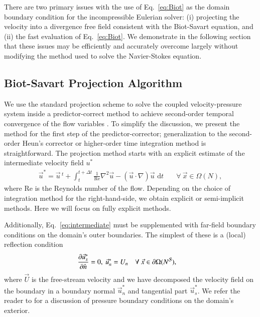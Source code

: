 \documentclass[final,1p,times]{elsarticle}
\begin{document}
There are two primary issues with the use of Eq.~\ref{eq:Biot} as the domain boundary condition for the incompressible Eulerian solver: (i) projecting the velocity into a divergence free field consistent with the Biot-Savart equation, and (ii) the fast evaluation of Eq.~\ref{eq:Biot}. We demonstrate in the following section that these issues may be efficiently and accurately overcome largely without modifying the method used to solve the Navier-Stokes equation.

\subsection{Biot-Savart Projection Algorithm}\label{sec:Biot_projection}

We use the standard projection scheme \cite{Chorin1967} to solve the coupled velocity-pressure system inside a predictor-correct method to achieve second-order temporal convergence of the flow variables \cite{Lauber2022}. 
To simplify the discussion, we present the method for the first step of the predictor-corrector; generalization to the second-order Heun's corrector or higher-order time integration method is straightforward. The projection method starts with an explicit estimate of the intermediate velocity field $u^*$
\begin{align}\label{eq:intermediate}
    \vec{u}^* = \vec{u}\,^t + \int_{t}^{t+\Delta t}\frac{1}{\text{Re}}\nabla^2\vec{u} -\left(\vec{u}\cdot\nabla\right)\vec{u}\text{ d}t &\quad\forall\ \vec{x}\in\Omega (N),
\end{align}
where $\text{Re}$ is the Reynolds number of the flow. Depending on the choice of integration method for the right-hand-side, we obtain explicit or semi-implicit methods. Here we will focus on fully explicit methods. 


Additionally, Eq.~\eqref{eq:intermediate} must be supplemented with far-field boundary conditions on the domain's outer boundaries. The simplest of these is a (local) reflection condition
\begin{align}\label{eq:BC_1}
    \frac{\partial \vec{u}^*_s}{\partial \hat{n}} = 0,\ \vec{u}^*_n = U_n &\quad\forall\ \vec{x}\in\partial\Omega (N^{\cal S}),
\end{align}
where $\vec U$ is the free-stream velocity and we have decomposed the velocity field on the boundary in a boundary normal $\vec{u}^*_n$ and tangential part $\vec{u}^*_s$. We refer the reader to \cite{Gresho1987} for a discussion of pressure boundary conditions on the domain's exterior.
\end{document}
